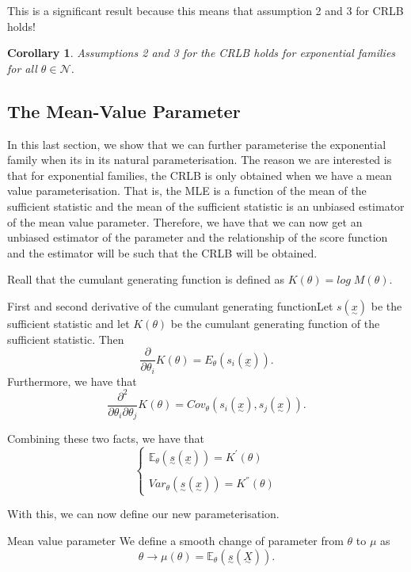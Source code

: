 \documentclass[twoside]{article}
\newtheorem{corollary}[theorem]{Corollary}
\newcommand{\utilde}{\underset{\sim}}
\begin{document}
This is a significant result because this means that assumption 2 and 3 for CRLB holds!

\begin{corollary} Assumptions 2 and 3 for the CRLB holds for exponential families for all $\theta \in \mathcal{N}$.
\end{corollary}

\subsection{The Mean-Value Parameter}
In this last section, we show that we can further parameterise the exponential family when its in its natural parameterisation. The reason we are interested is that for exponential families, the CRLB is only obtained when we have a mean value parameterisation. That is, the MLE is a function of the mean of the sufficient statistic and the mean of the sufficient statistic is an unbiased estimator of the mean value parameter. Therefore, we have that we can now get an unbiased estimator of the parameter and the relationship of the score function and the estimator will be such that the CRLB will be obtained.

Reall that the cumulant generating function is defined as $K(\theta) = log \;M(\theta).$

\begin{proposition_exam}{First and second derivative of the cumulant generating function}{}Let $s(\utilde{x})$ be the sufficient statistic and let $K(\theta)$ be the cumulant generating function of the sufficient statistic. Then
$$
\frac{\partial}{\partial \theta_i}K(\theta) = E_{\theta}(s_i(\utilde{x})).
$$
Furthermore, we have that 
$$
\frac{\partial^2}{\partial \theta_i \partial \theta_j}K(\theta) = Cov_{\theta}(s_i(\utilde{x}), s_j(\utilde{x})).
$$

Combining these two facts, we have that 
$$
\begin{cases}
\mathbb{E}_{\theta}(\utilde{s}(\utilde{x})) = K^{'}(\theta)\\\\
Var_{\theta}(\utilde{s}(\utilde{x})) = K^{''}(\theta)
\end{cases}
$$
\end{proposition_exam}

With this, we can now define our new parameterisation.

\begin{definition_exam}{Mean value parameter}{} We define a smooth change of parameter from $\theta$ to $\mu$ as 
$$
\theta \rightarrow \mu(\theta) = \mathbb{E}_{\theta}(\utilde{s}(\utilde{X})).
$$
\end{definition_exam}
\end{document}
